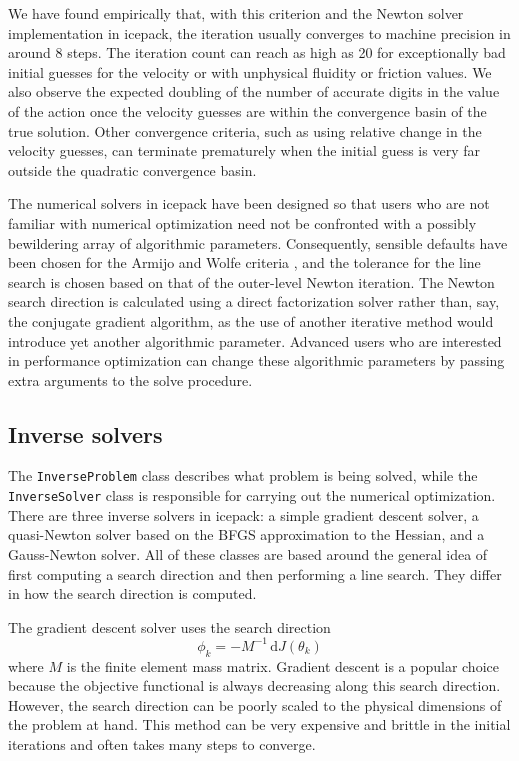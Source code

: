 \documentclass{article}
\theoremstyle{definition}
\theoremstyle{plain}
\newcommand{\ud}{\hspace{2pt}\mathrm{d}}
\begin{document}
We have found empirically that, with this criterion and the Newton solver implementation in icepack, the iteration usually converges to machine precision in around 8 steps.
The iteration count can reach as high as 20 for exceptionally bad initial guesses for the velocity or with unphysical fluidity or friction values.
We also observe the expected doubling of the number of accurate digits in the value of the action once the velocity guesses are within the convergence basin of the true solution.
Other convergence criteria, such as using relative change in the velocity guesses, can terminate prematurely when the initial guess is very far outside the quadratic convergence basin.

The numerical solvers in icepack have been designed so that users who are not familiar with numerical optimization need not be confronted with a possibly bewildering array of algorithmic parameters.
Consequently, sensible defaults have been chosen for the Armijo and Wolfe criteria \citep{nocedal2006numerical}, and the tolerance for the line search is chosen based on that of the outer-level Newton iteration.
The Newton search direction is calculated using a direct factorization solver rather than, say, the conjugate gradient algorithm, as the use of another iterative method would introduce yet another algorithmic parameter.
Advanced users who are interested in performance optimization can change these algorithmic parameters by passing extra arguments to the solve procedure.


\subsection{Inverse solvers} \label{sec:numerics-inverse-solvers}

The \texttt{InverseProblem} class describes what problem is being solved, while the \texttt{InverseSolver} class is responsible for carrying out the numerical optimization.
There are three inverse solvers in icepack: a simple gradient descent solver, a quasi-Newton solver based on the BFGS approximation to the Hessian, and a Gauss-Newton solver.
All of these classes are based around the general idea of first computing a search direction and then performing a line search.
They differ in how the search direction is computed.

The gradient descent solver uses the search direction
\begin{equation}
    \phi_k = -M^{-1}\ud J(\theta_k)
\end{equation}
where $M$ is the finite element mass matrix.
Gradient descent is a popular choice because the objective functional is always decreasing along this search direction.
However, the search direction can be poorly scaled to the physical dimensions of the problem at hand.
This method can be very expensive and brittle in the initial iterations and often takes many steps to converge.
\end{document}
